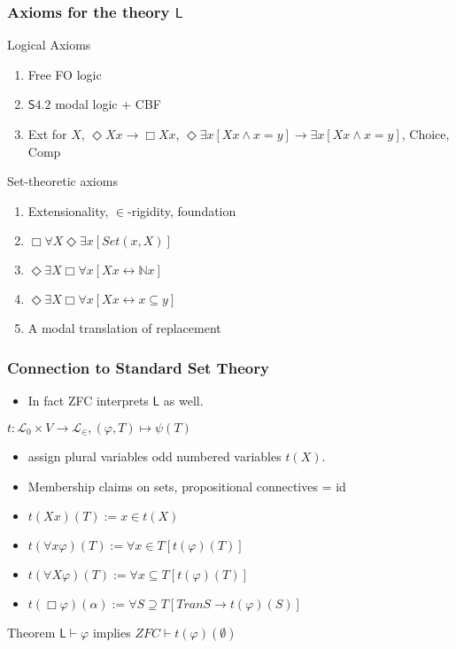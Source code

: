 \documentclass{beamer}
\begin{document}
\begin{frame}
    \frametitle{Axioms for the theory $\mathsf{L}$}
    \begin{block}{Logical Axioms}
    \begin{enumerate}
        \item Free FO logic
        \item $\mathsf{S4.2}$ modal logic + CBF
        \item Ext for $X$, $\Diamond Xx \rightarrow \Box Xx$, 
        $\Diamond \exists x[Xx \wedge x = y] \rightarrow \exists x[Xx \wedge x = y]$,
        Choice, Comp
    \end{enumerate}
    \end{block}
    \begin{block}{Set-theoretic axioms}
        \begin{enumerate}
        \item Extensionality, $\in$-rigidity, foundation
        \item $\Box \forall X \Diamond \exists x [Set(x, X)]$
        \item $\Diamond \exists X \Box \forall x[Xx \leftrightarrow \mathbb{N}x]$
        \item $\Diamond \exists X \Box \forall x[Xx \leftrightarrow x \subseteq y]$
        \item A modal translation of replacement
        \end{enumerate}
    \end{block}
\end{frame}
\begin{frame}
    \frametitle{Connection to Standard Set Theory}
\begin{itemize}
    \item In fact ZFC interprets $\mathsf{L}$ as well.
\end{itemize}
\begin{block}{$t : \mathcal{L}_0 \times V \to \mathcal{L}_\in, (\varphi, T) \mapsto \psi(T)$}
    \begin{itemize}
        \item<3-> assign plural variables odd numbered variables $t(X)$.
        \item<4-> Membership claims on sets, propositional connectives = id 
        \item<5-> $t(Xx)(T) := x \in t(X)$
        \item<6-> $t(\forall x \varphi)(T) := \forall x \in T [t(\varphi)(T)]$
        \item<7-> $t(\forall X \varphi)(T) := \forall x \subseteq T [t(\varphi)(T)]$
        \item<8-> $t(\Box \varphi)(\alpha) := \forall S \supseteq T [Tran S \rightarrow t(\varphi)(S)]$
    \end{itemize}
\end{block}
\begin{block}{Theorem}
  $\mathsf{L} \vdash \varphi$ implies $ZFC \vdash t(\varphi)(\emptyset)$  
\end{block}
\end{frame}
\end{document}
